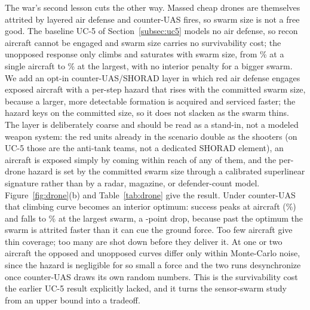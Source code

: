\documentclass[11pt]{article}
\begin{document}
The war's second lesson cuts the other way. Massed cheap drones are themselves attrited by layered air defense and counter-UAS fires, so swarm size is not a free good. The baseline UC-5 of Section~\ref{subsec:uc5} models no air defense, so recon aircraft cannot be engaged and swarm size carries no survivability cost; the unopposed response only climbs and saturates with swarm size, from \cuasOffSmallSucc\% at a single aircraft to \cuasOffLargeSucc\% at the largest, with no interior penalty for a bigger swarm. We add an opt-in counter-UAS/SHORAD layer in which red air defense engages exposed aircraft with a per-step hazard that rises with the committed swarm size, because a larger, more detectable formation is acquired and serviced faster; the hazard keys on the committed size, so it does not slacken as the swarm thins. The layer is deliberately coarse and should be read as a stand-in, not a modeled weapon system: the red units already in the scenario double as the shooters (on UC-5 those are the anti-tank teams, not a dedicated SHORAD element), an aircraft is exposed simply by coming within reach of any of them, and the per-drone hazard is set by the committed swarm size through a calibrated superlinear signature rather than by a radar, magazine, or defender-count model. Figure~\ref{fig:drone}(b) and Table~\ref{tab:drone} give the result. Under counter-UAS that climbing curve becomes an interior optimum: success peaks at \cuasPeakSize{} aircraft (\cuasOnPeakSucc\%) and falls to \cuasOnLargeSucc\% at the largest swarm, a \cuasOnDrop-point drop, because past the optimum the swarm is attrited faster than it can cue the ground force. Too few aircraft give thin coverage; too many are shot down before they deliver it. At one or two aircraft the opposed and unopposed curves differ only within Monte-Carlo noise, since the hazard is negligible for so small a force and the two runs desynchronize once counter-UAS draws its own random numbers. This is the survivability cost the earlier UC-5 result explicitly lacked, and it turns the sensor-swarm study from an upper bound into a tradeoff.
\end{document}
